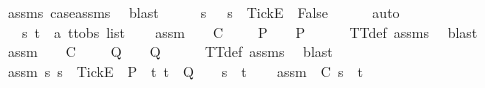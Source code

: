 \begin{isabellebody}
\ assms{\isacharparenleft}{}{\isacharparenright}\ case{\isacharunderscore}assms{\isacharparenleft}{}{\isacharparenright}\ \isamarkupfalse%
\ blast\isanewline
\ \ \isamarkupfalse%
\ \isamarkupfalse%
\ {\isachardoublequoteopen}{\isasymforall}s{\isachardot}\ {\isasymsigma}\ {\isasymnoteq}\ s\ {\isacharat}\ {\isacharbrackleft}{\isacharbrackleft}Tick{\isacharbrackright}\isactrlsub E{\isacharbrackright}\ {\isasymLongrightarrow}\ False{\isachardoublequoteclose}\isanewline
\ \ \ \ \isamarkupfalse%
\ auto\isanewline
{}\isamarkupfalse%
\isanewline
\ \ \isamarkupfalse%
\ {\isasymrho}\ {\isasymsigma}\ s\ t\ {\isacharcolon}{\isacharcolon}\ {\isachardoublequoteopen}{\isacharprime}a\ ttobs\ list{\isachardoublequoteclose}\isanewline
\ \ \isamarkupfalse%
\ assm{}{\isacharcolon}\ {\isachardoublequoteopen}{\isasymforall}{\isasymrho}\ {\isasymsigma}{\isachardot}\ {\isasymrho}\ {\isasymlesssim}\isactrlsub C\ {\isasymsigma}\ {\isasymand}\ {\isasymsigma}\ {\isasymin}\ P\ {\isasymlongrightarrow}\ {\isasymrho}\ {\isasymin}\ P{\isachardoublequoteclose}\isanewline
\ \ \ \ \isamarkupfalse%
\ TT{}{\isacharunderscore}def\ assms{\isacharparenleft}{}{\isacharparenright}\ \isamarkupfalse%
\ blast\isanewline
\ \ \isamarkupfalse%
\ assm{}{\isacharcolon}\ {\isachardoublequoteopen}{\isasymforall}{\isasymrho}\ {\isasymsigma}{\isachardot}\ {\isasymrho}\ {\isasymlesssim}\isactrlsub C\ {\isasymsigma}\ {\isasymand}\ {\isasymsigma}\ {\isasymin}\ Q\ {\isasymlongrightarrow}\ {\isasymrho}\ {\isasymin}\ Q{\isachardoublequoteclose}\isanewline
\ \ \ \ \isamarkupfalse%
\ TT{}{\isacharunderscore}def\ assms{\isacharparenleft}{}{\isacharparenright}\ \isamarkupfalse%
\ blast\isanewline
\ \ \isamarkupfalse%
\ assm{}{\isacharcolon}\ {\isachardoublequoteopen}{\isasymforall}s{\isachardot}\ s\ {\isacharat}\ {\isacharbrackleft}{\isacharbrackleft}Tick{\isacharbrackright}\isactrlsub E{\isacharbrackright}\ {\isasymin}\ P\ {\isasymlongrightarrow}\ {\isacharparenleft}{\isasymforall}t{\isachardot}\ t\ {\isasymin}\ Q\ {\isasymlongrightarrow}\ {\isasymrho}\ {\isasymnoteq}\ s\ {\isacharat}\ t{\isacharparenright}{\isachardoublequoteclose}\isanewline
\ \ \isamarkupfalse%
\ assm{}{\isacharcolon}\ {\isachardoublequoteopen}{\isasymrho}\ {\isasymlesssim}\isactrlsub C\ s\ {\isacharat}\ t{\isachardoublequoteclose}\isanewline

\end{isabellebody}
